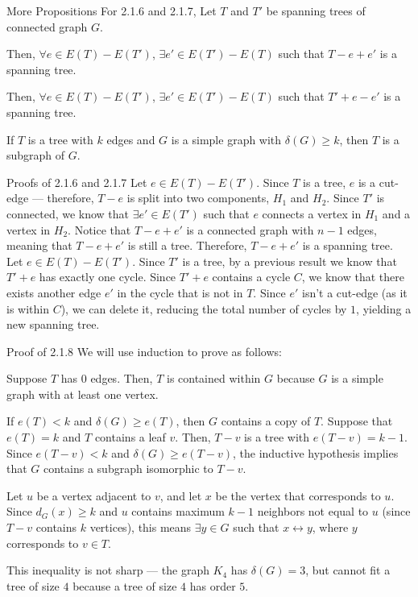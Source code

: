 \documentclass[10pt]{extarticle}
\begin{document}
\begin{problem}{More Propositions}
  For 2.1.6 and 2.1.7, Let $T$ and $T'$ be spanning trees of connected graph $G$. 
  \begin{description}[font=\normalfont]
    \item[(2.1.6)] Then, $\forall e\in E(T)-E(T')$, $\exists e'\in E(T')-E(T)$ such that $T-e+e'$ is a spanning tree.
    \item[(2.1.7)] Then, $\forall e\in E(T) - E(T')$, $\exists e'\in E(T') - E(T)$ such that $T'+e-e'$ is a spanning tree.
    \item[(2.1.8)] If $T$ is a tree with $k$ edges and $G$ is a simple graph with $\delta(G) \geq k$, then $T$ is a subgraph of $G$.
  \end{description}
  \begin{problem}{Proofs of 2.1.6 and 2.1.7}
    Let $e\in E(T)-E(T')$. Since $T$ is a tree, $e$ is a cut-edge --- therefore, $T-e$ is split into two components, $H_1$ and $H_2$. Since $T'$ is connected, we know that $\exists e'\in E(T')$ such that $e$ connects a vertex in $H_1$ and a vertex in $H_2$. Notice that $T-e+e'$ is a connected graph with $n-1$ edges, meaning that $T-e+e'$ is still a tree. Therefore, $T-e+e'$ is a spanning tree.\\

    Let $e\in E(T)-E(T')$. Since $T'$ is a tree, by a previous result we know that $T'+e$ has exactly one cycle. Since $T'+e$ contains a cycle $C$, we know that there exists another edge $e'$ in the cycle that is not in $T$. Since $e'$ isn't a cut-edge (as it is within $C$), we can delete it, reducing the total number of cycles by $1$, yielding a new spanning tree.
  \end{problem}
  \begin{problem}{Proof of 2.1.8}
    We will use induction to prove as follows:
    \begin{description}[font=\normalfont\scshape]
      \item[Base Case] Suppose $T$ has $0$ edges. Then, $T$ is contained within $G$ because $G$ is a simple graph with at least one vertex.
      \item[Inductive Hypothesis] If $e(T) < k$ and $\delta(G) \geq e(T)$, then $G$ contains a copy of $T$. Suppose that $e(T) = k$ and $T$ contains a leaf $v$. Then, $T-v$ is a tree with $e(T-v) = k-1$. Since $e(T-v)<k$ and $\delta(G) \geq e(T-v)$, the inductive hypothesis implies that $G$ contains a subgraph isomorphic to $T-v$. 
      \item[Proof] Let $u$ be a vertex adjacent to $v$, and let $x$ be the vertex that corresponds to $u$. Since $d_{G}(x)\geq k$ and $u$ contains maximum $k-1$ neighbors not equal to $u$ (since $T-v$ contains $k$ vertices), this means $\exists y\in G$ such that $x\leftrightarrow y$, where $y$ corresponds to $v\in T$.
    \end{description}
    This inequality is not sharp --- the graph $K_4$ has $\delta(G) = 3$, but cannot fit a tree of size $4$ because a tree of size $4$ has order $5$.
  \end{problem}
\end{problem}
\end{document}
